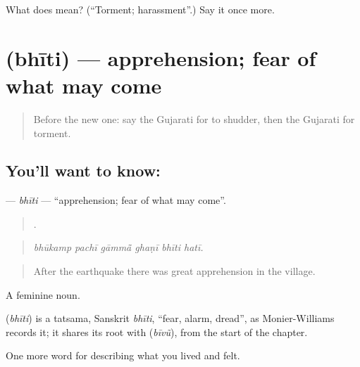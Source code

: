 \begin{tcolorbox}[breakable,colback=teal!4,colframe=teal!35!black,title={Before you move on}]
What does  mean? (\textquotedblleft{}Torment; harassment\textquotedblright{}.) Say it once more.
\end{tcolorbox}
\section[\texorpdfstring{\gu{ભીતિ} (bhīti)}{ભીતિ (bhīti)}]{ (bhīti) — apprehension; fear of what may come}

\label{lesson:GU-C453-bhiti}



\begin{quote}
Before the new one: say the Gujarati for to shudder, then the Gujarati for torment.
\end{quote}

\subsection*{You'll want to know: }
\textbf{} — \emph{bhīti} — \textquotedblleft{}apprehension; fear of what may come\textquotedblright{}.

\begin{quote}
     .
\end{quote}

\begin{quote}
\emph{bhūkamp pachī gāmmā̃ ghaṇī bhīti hatī.}
\end{quote}

\begin{quote}
After the earthquake there was great apprehension in the village.
\end{quote}

A feminine noun.

\begin{cousinweb}
\textbf{} (\emph{bhīti}) is a tatsama, Sanskrit \emph{bhīti}, \textquotedblleft{}fear, alarm, dread\textquotedblright{}, as Monier-Williams records it; it shares its root with \textbf{} (\emph{bīvũ}), from the start of the chapter.
\end{cousinweb}

\begin{grammarlens}[title={What you've built}]
One more word for describing what you lived and felt.
\end{grammarlens}


